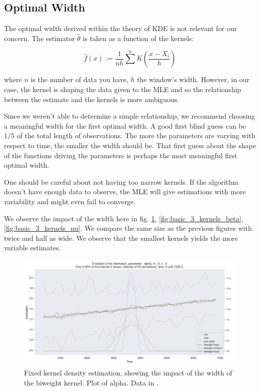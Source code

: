 \subsection{Optimal Width}
\label{subsection:optimal_width}


The optimal width derived within the theory of KDE is not relevant for our concern. The estimator $\widehat{\theta}$ is taken as a function of the kernels:

$$ \hat{f}(x) := \frac 1 {n h} \sum^n K \left ( \frac{x - X_i } {h}  \right )$$

where $n$ is the number of data you have, $h$ the window's width. However, in our case, the kernel is shaping the data given to the MLE and so the relationship between the estimate and the kernels is more ambiguous.


Since we weren't able to determine a simple relationship, we recommend choosing a meaningful width for the first optimal width. A good first blind guess can be $1/5$ of the total length of observations. The more the parameters are varying with respect to time, the smaller the width should be. That first guess about the shape of the functions driving the parameters is perhaps the most meaningful first optimal width.

\begin{remarque}
One should be careful about not having too narrow kernels. If the algorithm doesn't have enough data to observe, the MLE will give estimations with more variability and might even fail to converge.
\end{remarque}

We observe the impact of the width here in fig. \ref{fig:basic_3_kernels_alpha}, \ref{fig:basic_3_kernels_beta}, \ref{fig:basic_3_kernels_nu}. We compare the same size as the previous figures with twice and half as wide. We observe that the smallest kernels yields the more variable estimates.

\begin{figure}
\centering
\includegraphics[width = 0.90 \textwidth]{../imag/chap3/compar_kernel/3alpha.png}
\caption{Fixed kernel density estimation, showing the impact of the width of the biweight kernel. Plot of alpha. Data in \protect {}.}
\label{fig:basic_3_kernels_alpha}
\end{figure}

